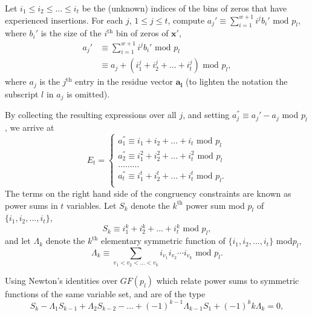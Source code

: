 Let $i_1 \leq i_2 \leq ... \leq i_t$ be the (unknown) indices of
the bins of zeros that have experienced insertions. For each $j$,
$1\leq j \leq t$, compute $a_j'\equiv \sum_{i=1}^{w+1} i^jb_i'
\text{ mod } p_l$, where $b_i'$ is the size of the $i^{\text{th}}$
bin of zeros of $\mathbf{x'}$,
\begin{equation}\begin{array}{ll}
a_j'& \equiv \sum_{i=1}^{w+1} i^jb_i' \text{ mod } p_l\\
{}  & \equiv a_j + (i_1^j+i_2^j+...+i_t^j) \text{ mod }p_l,
\end{array}
\end{equation}
where $a_j$ is the $j^{\text{th}}$ entry in the residue vector
$\mathbf{a_l}$ (to lighten the notation the subscript $l$ in $a_j$
is omitted).

By collecting the resulting expressions over all $j$, and setting
$a_j^{''} \equiv a_j'-a_j$ mod $p_l$, we arrive at
\begin{equation}
E_t=\left\{
\begin{array}{ll}
a_1^{''} \equiv i_1+i_2+...+i_t \text{ mod }p_l\\
a_2^{''} \equiv i_1^2+i_2^2+...+i_t^2 \text{ mod }p_l\\
\dots \dots \dots\\
a_t^{''} \equiv i_1^t+i_2^t+...+i_t^t \text{ mod }p_l.\\
\end{array} \right.
\end{equation}
The terms on the right hand side of the congruency constraints are
known as power sums in $t$ variables. Let $S_k$ denote the
$k^{\text{th}}$ power sum mod $p_l$ of $\{i_1,i_2,...,i_t\}$,
\begin{equation}
S_k\equiv i_1^k+i_2^k+...+i_t^k \text{ mod }p_l,
\end{equation}
and let $\Lambda_k$ denote the $k^{\text{th}}$ elementary
symmetric function of  $\{i_1,i_2,...,i_t\}$ mod$p_l$,
\begin{equation}
\Lambda_k \equiv \sum_{v_1<v_2<...<v_k} i_{v_1}i_{v_2}\cdots
i_{v_k} \text{ mod } p_l.
\end{equation}

Using Newton's identities over $GF(p_l)$ which relate power sums
to symmetric functions of the same variable set, and are of the
type
\begin{equation}\label{newton}
S_k-\Lambda_{1}S_{k-1}+\Lambda_{2}S_{k-2}-...+(-1)^{k-1}\Lambda_{k-1}S_{1}+(-1)^kk\Lambda_{k}
=0,
\end{equation}

